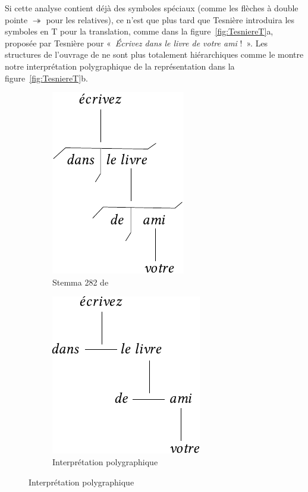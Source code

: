 {    Si cette analyse contient déjà des symboles spéciaux (comme les flèches à double pointe \textrm{$\twoheadrightarrow $} pour les relatives), ce n’est que plus tard que Tesnière introduira les symboles en T pour la translation, comme dans la figure~\ref{fig:TesniereT}a, proposée par Tesnière pour «~\textit{Écrivez dans le livre de votre ami} !~». Les structures de l’ouvrage de \citeyear{tesniere1959elements} ne sont plus totalement hiérarchiques comme le montre notre interprétation polygraphique de la représentation dans la figure~\ref{fig:TesniereT}b.
    
    \begin{figure}[H]
    \caption{Interprétation polygraphique d'un stemma\label{fig:TesniereT}}
    \begin{subfigure}[b]{.5\textwidth}\centering
    \includegraphics[scale=.9]{figures/polygraphs/poly-3.3.5-1.pdf}
    \caption{Stemma 282 de \citet{tesniere1959elements}}
    \end{subfigure}%
    \begin{subfigure}[b]{.5\textwidth}\centering
    \includegraphics[scale=.9]{figures/polygraphs/poly-3.3.5-2.pdf}
    \caption{Interprétation polygraphique}
    \end{subfigure}
    \end{figure}
}

